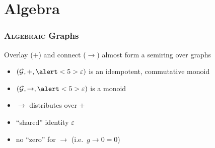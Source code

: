 \documentclass{beamer}
\renewcommand{\epsilon}{\varepsilon}
\newcommand{\eps}{\epsilon}
\newcommand{\connect}{\rightarrow}
\begin{document}
\section{Algebra}
\begin{frame}
  \frametitle{\textsc{Algebraic} Graphs}
  \onslide<+->
  \begin{alertblock}{Overlay ($+$) and connect ($\connect$) almost form a semiring over graphs}
    \begin{itemize}[<+->]
    \item $(\mathcal{G}, +, \alert<5>{\eps})$ is an idempotent, commutative monoid
    \item $(\mathcal{G}, \connect, \alert<5>{\eps})$ is a monoid
    \item $\connect$ distributes over $+$ 
    \end{itemize}
  \end{alertblock}

  \begin{itemize}[<+->]
  \item ``shared'' identity \alert{$\eps$}
  \item no ``zero'' for $\connect$ (i.e.\ $g \connect 0 = 0$)
  \end{itemize}
\end{frame}
\end{document}
